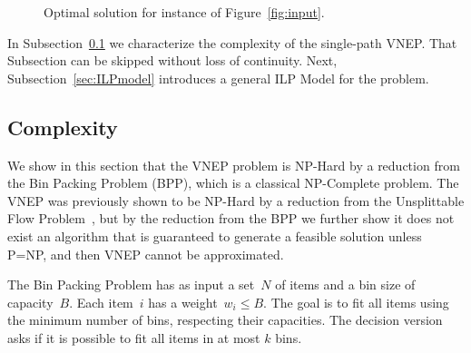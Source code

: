 \documentclass[conference]{IEEEtran}
\begin{document}
\begin{figure}[h]
  \centering
{}
  \caption{Optimal solution for instance of Figure~\ref{fig:input}.\label{fig:mapping}}   
\end{figure}


In Subsection~\ref{sec:complexity} we characterize the complexity of the single-path VNEP.
That Subsection can be skipped without loss of continuity.
Next, Subsection~\ref{sec:ILPmodel} introduces a general ILP Model for the problem.

\subsection{Complexity}
\label{sec:complexity}
We show in this section that %
the VNEP problem is NP-Hard by a reduction from the Bin Packing Problem (BPP), which is a classical NP-Complete problem.
The VNEP was previously shown to be NP-Hard by a reduction from the Unsplittable Flow Problem~\cite{Yu2008}, 
but by the reduction from the BPP we further show it does not exist an algorithm that is guaranteed to generate a feasible solution unless P=NP, and then VNEP cannot be approximated.

The Bin Packing Problem has as input a set~$N$ of items and a bin size of capacity~$B$.  Each item~$i$ has a weight~$w_{i} \leq B$. The goal is to fit all items using the minimum number of bins, respecting their capacities. The decision version asks if it is possible to fit all items in at most $k$ bins.
\end{document}
